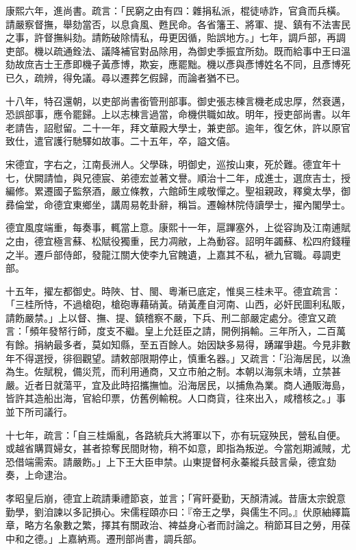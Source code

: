 \begin{pinyinscope}
康熙六年，進尚書。疏言：「民窮之由有四：雜捐私派，棍徒哧詐，官貪而兵橫。請嚴察督撫，舉劾當否，以息貪風、甦民命。各省籓王、將軍、提、鎮有不法害民之事，許督撫糾劾。請飭破除情私，毋更因循，貽誤地方。」七年，調戶部，再調吏部。機以疏通銓法、議降補官對品除用，為御史季振宜所劾。既而給事中王曰溫劾故庶吉士王彥即機子黃彥博，欺妄，應罷黜。機以彥與彥博姓名不同，且彥博死已久，疏辨，得免議。尋以遷葬乞假歸，而論者猶不已。

十八年，特召還朝，以吏部尚書銜管刑部事。御史張志棟言機老成忠厚，然衰邁，恐誤部事，應令罷歸。上以志棟言過當，命機供職如故。明年，授吏部尚書。以年老請告，詔慰留。二十一年，拜文華殿大學士，兼吏部。逾年，復乞休，許以原官致仕，遣官護行馳驛如故事。二十五年，卒，謚文僖。

宋德宜，字右之，江南長洲人。父學硃，明御史，巡按山東，死於難。德宜年十七，伏闕請恤，與兄德宸、弟德宏並著文譽。順治十二年，成進士，選庶吉士，授編修。累遷國子監祭酒，嚴立條教，六館師生咸敬憚之。聖祖親政，釋奠太學，御彞倫堂，命德宜東鄉坐，講周易乾卦辭，稱旨。遷翰林院侍讀學士，擢內閣學士。

德宜風度端重，每奏事，輒當上意。康熙十一年，扈蹕塞外，上從容詢及江南逋賦之由，德宜極言蘇、松賦役獨重，民力凋敝，上為動容。詔明年蠲蘇、松四府錢糧之半。遷戶部侍郎，發龍江關大使李九官餽遺，上嘉其不私，褫九官職。尋調吏部。

十五年，擢左都御史。時陜、甘、閩、粵漸已底定，惟吳三桂未平。德宜疏言：「三桂所恃，不過槍砲，槍砲專藉硝黃。硝黃產自河南、山西，必奸民圖利私販，請飭嚴禁。」上以督、撫、提、鎮稽察不嚴，下兵、刑二部嚴定處分。德宜又疏言：「頻年發帑行師，度支不繼。皇上允廷臣之請，開例捐輸。三年所入，二百萬有餘。捐納最多者，莫如知縣，至五百餘人。始因缺多易得，踴躍爭趨。今見非數年不得選授，徘徊觀望。請敕部限期停止，慎重名器。」又疏言：「沿海居民，以漁為生。佐賦稅，備災荒，而利用通商，又立市舶之制。本朝以海氛未靖，立禁甚嚴。近者日就蕩平，宜及此時招攜撫恤。沿海居民，以捕魚為業。商人通販海島，皆許其造船出海，官給印票，仿舊例輸稅。人口商貨，往來出入，咸稽核之。」事並下所司議行。

十七年，疏言：「自三桂煽亂，各路統兵大將軍以下，亦有玩寇殃民，營私自便。或越省購買婦女，甚者掠奪民間財物，稍不如意，即指為叛逆。今當剋期滅賊，尤恐借端需索。請嚴飭。」上下王大臣申禁。山東提督柯永蓁縱兵鼓言喿，德宜劾奏，上命逮治。

孝昭皇后崩，德宜上疏請秉禮節哀，並言；「宵旰憂勤，天顏清減。昔唐太宗銳意勤學，劉洎諫以多記損心。宋儒程頤亦曰：『帝王之學，與儒生不同。』伏原紬繹篇章，略方名象數之繁，擇其有關政治、裨益身心者而討論之。稍節耳目之勞，用葆中和之德。」上嘉納焉。遷刑部尚書，調兵部。


\end{pinyinscope}
